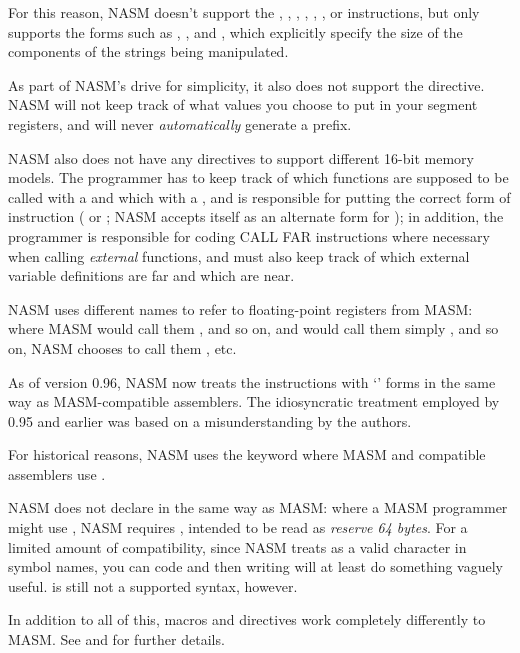 For this reason, NASM doesn't support the , ,
, , , , or 
instructions, but only supports the forms such as ,
, and , which explicitly specify the size
of the components of the strings being manipulated.


As part of NASM's drive for simplicity, it also does not support the
 directive. NASM will not keep track of what values you
choose to put in your segment registers, and will never \emph{automatically}
generate a  prefix.


NASM also does not have any directives to support different 16-bit
memory models. The programmer has to keep track of which functions
are supposed to be called with a  and which with a
, and is responsible for putting the correct form of
 instruction ( or ; NASM accepts
 itself as an alternate form for ); in addition,
the programmer is responsible for coding CALL FAR instructions where
necessary when calling \emph{external} functions, and must also keep
track of which external variable definitions are far and which are
near.


NASM uses different names to refer to floating-point registers from
MASM: where MASM would call them ,  and
so on, and  would call them simply , 
and so on, NASM chooses to call them ,  etc.

As of version 0.96, NASM now treats the instructions with
`' forms in the same way as MASM-compatible assemblers.
The idiosyncratic treatment employed by 0.95 and earlier was based
on a misunderstanding by the authors.


For historical reasons, NASM uses the keyword  where
MASM and compatible assemblers use .

NASM does not declare  in the same way
as MASM: where a MASM programmer might use ,
NASM requires , intended to be read as \emph{reserve 64
bytes}. For a limited amount of compatibility, since NASM treats
 as a valid character in symbol names, you can code 
and then writing  will at least do something vaguely useful.
 is still not a supported syntax, however.

In addition to all of this, macros and directives work completely
differently to MASM. See  and 
for further details.
